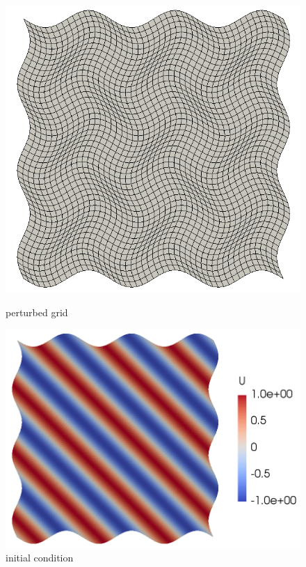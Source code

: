 \documentclass[12pt]{article}
\begin{document}
\begin{figure}[h!]
	\centering
	\begin{minipage}[b]{0.34\textwidth}
	  \includegraphics[width=\textwidth]{grid.png}
	  \caption{perturbed grid}
	  \label{grid}
	\end{minipage}
	\hfill
	\begin{minipage}[b]{0.45\textwidth}
	  \includegraphics[width=\textwidth]{plane_wave_initial.png}
	  \caption{initial condition}
	  \label{plane wave}
	\end{minipage}
  \end{figure}
\end{document}
